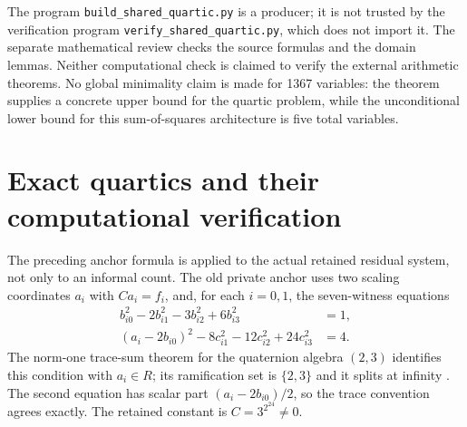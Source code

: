 \documentclass[11pt]{article}
\theoremstyle{definition}
\begin{document}
The program \nolinkurl{build_shared_quartic.py} is a producer; it is not
trusted by the verification program
\nolinkurl{verify_shared_quartic.py}, which does not import it.
The separate mathematical review checks the source formulas and the
domain lemmas.  Neither computational check is claimed to verify the
external arithmetic theorems.  No global minimality claim is made for
1367 variables: the theorem supplies a concrete upper bound for the
quartic problem, while the unconditional lower bound for this
sum-of-squares architecture is five total variables.


\section{Exact quartics and their computational verification}
\label{sec:quartic-artifacts}

The preceding anchor formula is applied to the actual retained residual
system, not only to an informal count. The old private anchor uses two
scaling coordinates $a_i$ with $Ca_i=f_i$, and, for each $i=0,1$, the
seven-witness equations
\begin{align*}
 b_{i0}^2-2b_{i1}^2-3b_{i2}^2+6b_{i3}^2&=1,\\
 (a_i-2b_{i0})^2-8c_{i1}^2-12c_{i2}^2+24c_{i3}^2&=4.
\end{align*}
The norm-one trace-sum theorem for the quaternion algebra $(2,3)$
identifies this condition with $a_i\in R$; its ramification set is
$\{2,3\}$ and it splits at infinity
\cite[Proposition 6]{Koenigsmann2016}. The second equation has scalar
part $(a_i-2b_{i0})/2$, so the trace convention agrees exactly.
The retained constant is $C=3^{2^{24}}\ne0$.
\end{document}
